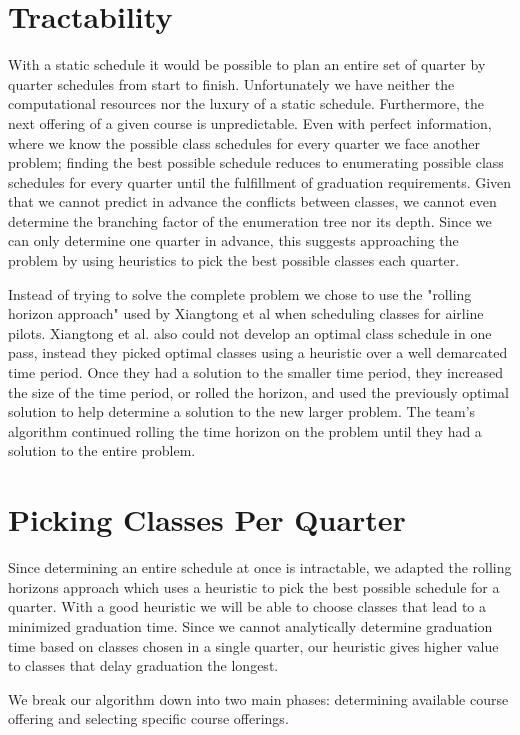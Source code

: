 \documentclass[11pt]{article} %
\begin{document}
\section{Tractability} With a static schedule it would be
possible to plan an entire set of quarter by quarter schedules from start to
finish.  Unfortunately we have neither the computational resources nor the luxury
of a static schedule.  Furthermore, the next offering of a given course is unpredictable.
Even with perfect information, where we know the possible class schedules for every
quarter we face another problem; finding the best possible schedule reduces to
enumerating possible class schedules for every quarter until the fulfillment of graduation
requirements.  Given that we cannot predict in advance the
conflicts between classes, we cannot even determine the branching factor of the
enumeration tree nor its depth.  Since we can only determine one quarter in
advance, this suggests approaching the problem by using heuristics to pick the
best possible classes each quarter.

Instead of trying to solve the complete problem we chose to use the "rolling
horizon approach" used by Xiangtong et al \cite{xiangton:informs} when
scheduling classes for airline pilots.  Xiangtong et al. also could not develop
an optimal class schedule in one pass, instead they picked optimal classes
using a heuristic over a well demarcated time period.  Once they had a solution
to the smaller time period, they increased the size of the time period, or rolled
the horizon, and used the previously optimal solution to help determine
a solution to the new larger problem.  The team's algorithm continued rolling the
time horizon on the problem until they had a solution to the entire problem.

\section{Picking Classes Per Quarter} Since determining an entire schedule at
once is intractable, we adapted the rolling horizons approach which uses
a heuristic to pick the best possible schedule for a quarter.  With a good
heuristic we will be able to choose classes that lead to a minimized graduation
time.  Since we cannot analytically determine graduation time based on classes
chosen in a single quarter, our heuristic gives higher value to classes
that delay graduation the longest.

We break our algorithm down into two main phases: determining available course
offering and selecting specific course offerings.
\end{document}
